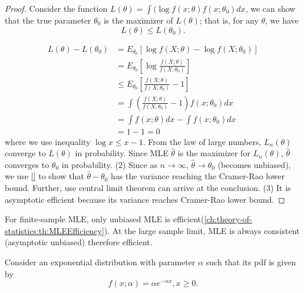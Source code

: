 \begin{refsection}
\begin{proof}
Consider the function $L(\theta) = \int (\log f(x;\theta) f(x;\theta_0)dx$, we can show that the true parameter $\theta_0$ is the maximizer of $L(\theta)$; that is, for any $\theta$, we have $$L(\theta)\leq L(\theta_0).$$

\begin{align*}
L(\theta) - L(\theta_0) &= E_{\theta_0}[\log f(X;\theta) - \log f(X;\theta_0)] \\
&= E_{\theta_0}[\log \frac{f(X;\theta)}{f(X;\theta_0)}] \\
&\leq E_{\theta_0}[ \frac{f(X;\theta)}{f(X;\theta_0)} - 1] \\
&=  \int (\frac{f(X;\theta)}{f(X;\theta_0)} - 1) f(x;\theta_0) dx \\
&= \int f(x;\theta)dx - \int f(x;\theta_0) dx \\
& = 1 - 1 =0
\end{align*}
where we use inequality $\log x \leq x - 1$. 
From the law of large numbers, $L_n(\theta)$ converge to $L(\theta)$ in probability. 
Since MLE $\hat{\theta}$ is the maximizer for $L_n(\theta)$, $\hat{\theta}$ converges to $\theta_0$ in probability.	
(2) Since as $n\to \infty$, $\hat{\theta} \to \theta_0$ (becomes unbiased), we use \autoref{} to show that $\hat{\theta} - \theta_0$ has the variance reaching the Cramer-Rao lower bound. Further, use central limit theorem can arrive at the conclusion.
(3) It is asymptotic efficient because its variance reaches Cramer-Rao lower bound. 
\end{proof}


\begin{remark}\hfill
For finite-sample MLE, only unbiased MLE is efficient(\autoref{ch:theory-of-statistics:th:MLEEfficiency}). At the large sample limit, MLE is always consistent (asymptotic unbiased) therefore efficient. 	
\end{remark}

\begin{example}
Consider an exponential distribution with parameter $\alpha$ such that its pdf is given by
$$f(x;\alpha) = \alpha e^{-\alpha x}, x\geq 0.$$


\end{example}
\end{refsection}
